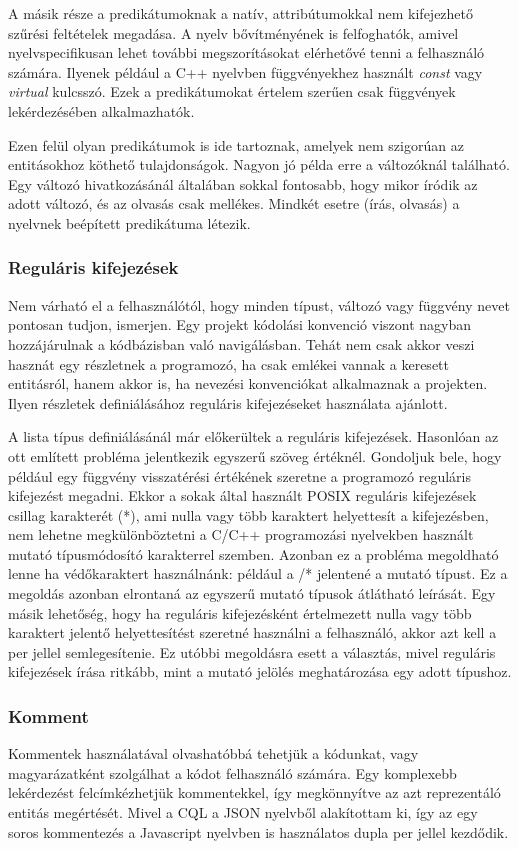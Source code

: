 \documentclass[a4paper,12pt]{report}
\begin{document}
\par A másik része a predikátumoknak a natív, attribútumokkal nem kifejezhető szűrési feltételek megadása. A nyelv bővítményének is felfoghatók, amivel nyelvspecifikusan lehet további megszorításokat elérhetővé tenni a felhasználó számára. Ilyenek például a C++ nyelvben függvényekhez használt \textit{const} vagy \textit{virtual} kulcsszó. Ezek a predikátumokat értelem szerűen csak függvények lekérdezésében alkalmazhatók.
\par Ezen felül olyan predikátumok is ide tartoznak, amelyek nem szigorúan az entitásokhoz köthető tulajdonságok. Nagyon jó példa erre a változóknál található. Egy változó hivatkozásánál általában sokkal fontosabb, hogy mikor íródik az adott változó, és az olvasás csak mellékes. Mindkét esetre (írás, olvasás) a nyelvnek beépített predikátuma létezik.
\subsubsection{Reguláris kifejezések}
Nem várható el a felhasználótól, hogy minden típust, változó vagy függvény nevet pontosan tudjon, ismerjen. Egy projekt kódolási konvenció viszont nagyban hozzájárulnak a kódbázisban való navigálásban. Tehát nem csak akkor veszi hasznát egy részletnek a programozó, ha csak emlékei vannak a keresett entitásról, hanem akkor is, ha nevezési konvenciókat alkalmaznak a projekten. Ilyen részletek definiálásához reguláris kifejezéseket használata ajánlott.
\par A lista típus definiálásánál már előkerültek a reguláris kifejezések. Hasonlóan az ott említett probléma jelentkezik egyszerű szöveg értéknél. Gondoljuk bele, hogy például egy függvény visszatérési értékének szeretne a programozó reguláris kifejezést megadni. Ekkor a sokak által használt POSIX reguláris kifejezések csillag karakterét (*), ami nulla vagy több karaktert helyettesít a kifejezésben, nem lehetne megkülönböztetni a C/C++ programozási nyelvekben használt mutató típusmódosító karakterrel szemben. Azonban ez a probléma megoldható lenne ha védőkaraktert használnánk: például a /* jelentené a mutató típust. Ez a megoldás azonban elrontaná az egyszerű mutató típusok átlátható leírását. Egy másik lehetőség, hogy ha reguláris kifejezésként értelmezett nulla vagy több karaktert jelentő helyettesítést szeretné használni a felhasználó, akkor azt kell a per jellel semlegesítenie. Ez utóbbi megoldásra esett a választás, mivel reguláris kifejezések írása ritkább, mint a mutató jelölés meghatározása egy adott típushoz.
\subsubsection{Komment}
Kommentek használatával olvashatóbbá tehetjük a kódunkat, vagy magyarázatként szolgálhat a kódot felhasználó számára. Egy komplexebb lekérdezést felcímkézhetjük kommentekkel, így megkönnyítve az azt reprezentáló entitás megértését. Mivel a CQL a JSON nyelvből alakítottam ki, így az egy soros kommentezés a Javascript nyelvben is használatos dupla per jellel kezdődik.
\end{document}

